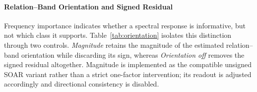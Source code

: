 \documentclass[10pt,journal]{IEEEtran}
\begin{document}
\begin{table}[!h]
\centering
\caption{Effect of relation--band class orientation under abundant and
scarce supervision. All entries are mean AUROC and Macro-F1 (\%).}
\label{tab:orientation}
\scriptsize
\setlength{\tabcolsep}{2.8pt}
\renewcommand{\arraystretch}{1.10}
\end{table}

\paragraph{Relation--Band Orientation and Signed Residual}
Frequency importance indicates whether a spectral response is informative,
but not which class it supports. Table~\ref{tab:orientation} isolates this
distinction through two controls. \emph{Magnitude} retains the magnitude of
the estimated relation--band orientation while discarding its sign, whereas
\emph{Orientation off} removes the signed residual altogether. Magnitude is
implemented as the compatible unsigned SOAR variant rather than a strict
one-factor intervention; its readout is adjusted accordingly and directional
consistency is disabled.
\end{document}
